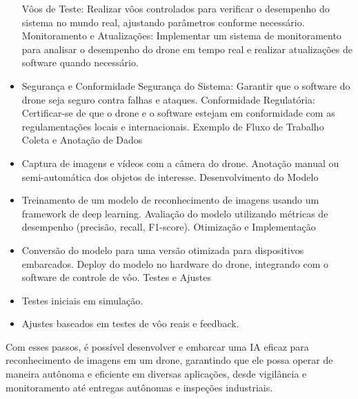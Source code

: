 \documentclass[a4paper,12pt]{article} %
\begin{document}
\begin{itemize}
Vôos de Teste: Realizar vôos controlados para verificar o desempenho do sistema no mundo real, ajustando parâmetros conforme necessário.
Monitoramento e Atualizações: Implementar um sistema de monitoramento para analisar o desempenho do drone em tempo real e realizar atualizações de software quando necessário.
\item Segurança e Conformidade
Segurança do Sistema: Garantir que o software do drone seja seguro contra falhas e ataques.
Conformidade Regulatória: Certificar-se de que o drone e o software estejam em conformidade com as regulamentações locais e internacionais.
Exemplo de Fluxo de Trabalho
Coleta e Anotação de Dados

\item Captura de imagens e vídeos com a câmera do drone.
Anotação manual ou semi-automática dos objetos de interesse.
Desenvolvimento do Modelo

\item Treinamento de um modelo de reconhecimento de imagens usando um framework de deep learning.
Avaliação do modelo utilizando métricas de desempenho (precisão, recall, F1-score).
Otimização e Implementação

\item Conversão do modelo para uma versão otimizada para dispositivos embarcados.
Deploy do modelo no hardware do drone, integrando com o software de controle de vôo.
Testes e Ajustes

\item Testes iniciais em simulação.
\item Ajustes baseados em testes de vôo reais e feedback.
\end{itemize}
Com esses passos, é possível desenvolver e embarcar uma IA eficaz para reconhecimento de imagens em um drone, garantindo que ele possa operar de maneira autônoma e eficiente em diversas aplicações, desde vigilância e monitoramento até entregas autônomas e inspeções industriais.
\end{document}
